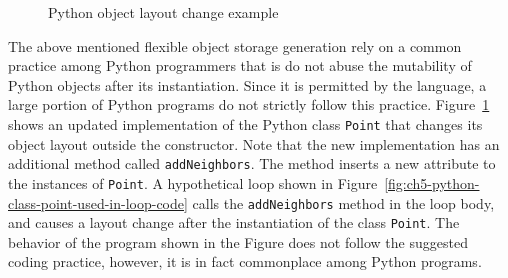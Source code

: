 \begin{figure}
\centering
{}
\caption{Python object layout change example}
\label{fig:ch5-python-object-layout-change-example-code}
\end{figure}

The above mentioned flexible object storage generation rely on a common practice among Python programmers that is do not abuse the mutability of Python objects after its instantiation.
Since it is permitted by the language, a large portion of Python programs do not strictly follow this practice.
Figure~\ref{fig:ch5-python-object-layout-change-example-code} shows an updated implementation of the Python class \texttt{Point} that changes its object layout outside the constructor.
Note that the new implementation has an additional method called \texttt{addNeighbors}.
The method inserts a new attribute to the instances of \texttt{Point}.
A hypothetical loop shown in Figure~\ref{fig:ch5-python-class-point-used-in-loop-code} calls the \texttt{addNeighbors} method in the loop body, and causes a layout change after the instantiation of the class \texttt{Point}.
The behavior of the program shown in the Figure does not follow the suggested coding practice, however, it is in fact commonplace among Python programs.


